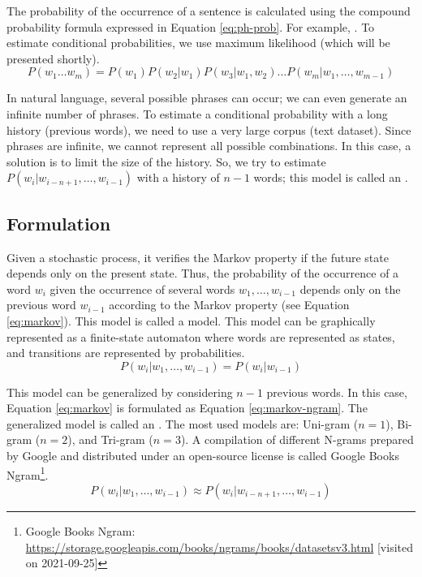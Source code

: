 \documentclass{KBook}
\begin{document}
The probability of the occurrence of a sentence is calculated using the compound probability formula expressed in Equation \ref{eq:ph-prob}.
For example, .
To estimate conditional probabilities, we use maximum likelihood (which will be presented shortly).
\begin{equation}\label{eq:ph-prob}
	P(w_1 \ldots w_m) =  P(w_1) P(w_2 | w_1) P(w_3 | w_1, w_2) \ldots P(w_m | w_1, \ldots, w_{m-1})
\end{equation}

In natural language, several possible phrases can occur; we can even generate an infinite number of phrases.
To estimate a conditional probability with a long history (previous words), we need to use a very large corpus (text dataset).
Since phrases are infinite, we cannot represent all possible combinations.
In this case, a solution is to limit the size of the history.
So, we try to estimate $P(w_i|w_{i-n+1},\ldots,w_{i-1})$ with a history of $n-1$ words; 
this model is called an .


\subsection{Formulation}

Given a stochastic process, it verifies the Markov property if the future state depends only on the present state.
Thus, the probability of the occurrence of a word $w_i$ given the occurrence of several words $w_1, \ldots, w_{i-1}$ depends only on the previous word $w_{i-1}$ according to the Markov property (see Equation \ref{eq:markov}).
This model is called a  model.
This model can be graphically represented as a finite-state automaton where words are represented as states, and transitions are represented by probabilities.
\begin{equation}
	P(w_i | w_1,\ldots, w_{i-1}) = P(w_i | w_{i-1})
	\label{eq:markov}
\end{equation}

This model can be generalized by considering $n-1$ previous words.
In this case, Equation \ref{eq:markov} is formulated as Equation \ref{eq:markov-ngram}.
The generalized model is called an .
The most used models are: Uni-gram ($n=1$), Bi-gram ($n=2$), and Tri-gram ($n=3$).
A compilation of different N-grams prepared by Google and distributed under an open-source license is called Google Books Ngram\footnote{Google Books Ngram: \url{https://storage.googleapis.com/books/ngrams/books/datasetsv3.html} [visited on 2021-09-25]}.
\begin{equation}
	P(w_i | w_1,\ldots, w_{i-1}) \approx P(w_i | w_{i-n+1}, \ldots, w_{i-1})
	\label{eq:markov-ngram}
\end{equation}
\end{document}
